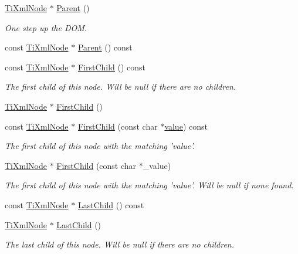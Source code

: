 \begin{DoxyCompactItemize}
\hyperlink{classTiXmlNode}{TiXmlNode} $\ast$ \hyperlink{classTiXmlNode_ab643043132ffd794f8602685d34a982e}{Parent} ()
\begin{DoxyCompactList}\small\item\em One step up the DOM. \item\end{DoxyCompactList}\item 
const \hyperlink{classTiXmlNode}{TiXmlNode} $\ast$ \hyperlink{classTiXmlNode_a78878709e53066f06eb4fcbcdd3a5260}{Parent} () const 
\item 
const \hyperlink{classTiXmlNode}{TiXmlNode} $\ast$ \hyperlink{classTiXmlNode_a44c8eee26bbe2d1b2762038df9dde2f0}{FirstChild} () const 
\begin{DoxyCompactList}\small\item\em The first child of this node. Will be null if there are no children. \item\end{DoxyCompactList}\item 
\hyperlink{classTiXmlNode}{TiXmlNode} $\ast$ \hyperlink{classTiXmlNode_a5e97d69b7c0ebd27fb7286be56559b77}{FirstChild} ()
\item 
const \hyperlink{classTiXmlNode}{TiXmlNode} $\ast$ \hyperlink{classTiXmlNode_ab5f722624113c8203227de4f56576d31}{FirstChild} (const char $\ast$\hyperlink{classTiXmlNode_aead528b3cedc33c16a6c539872c7cc8b}{value}) const 
\begin{DoxyCompactList}\small\item\em The first child of this node with the matching 'value'. \item\end{DoxyCompactList}\item 
\hyperlink{classTiXmlNode}{TiXmlNode} $\ast$ \hyperlink{classTiXmlNode_abc8bf32be6419ec453a731868de19554}{FirstChild} (const char $\ast$\_\-value)
\begin{DoxyCompactList}\small\item\em The first child of this node with the matching 'value'. Will be null if none found. \item\end{DoxyCompactList}\item 
const \hyperlink{classTiXmlNode}{TiXmlNode} $\ast$ \hyperlink{classTiXmlNode_a6d671107e00cca1d28cb2d7f3a87a21e}{LastChild} () const 
\item 
\hyperlink{classTiXmlNode}{TiXmlNode} $\ast$ \hyperlink{classTiXmlNode_a6432d2b2495f6caf9cb4278df706a031}{LastChild} ()
\begin{DoxyCompactList}\small\item\em The last child of this node. Will be null if there are no children. \item\end{DoxyCompactList}\item 

\end{DoxyCompactItemize}
